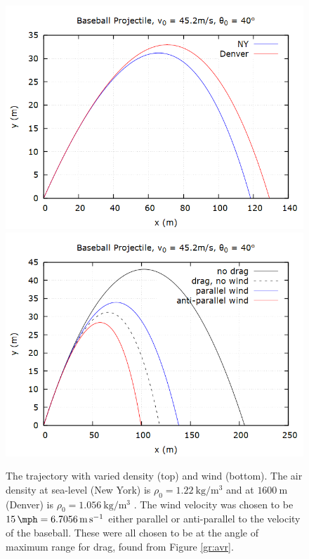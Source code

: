 \documentclass[aps,prl,twocolumn,superscriptaddress]{revtex4-1}
\begin{document}
\begin{figure}[htbp]
  	\begin{center}
 		\includegraphics[scale=0.3]{NYvDen.png}
 		\includegraphics[scale=0.3]{wind.png}
  		\caption{The trajectory with varied density (top) and wind (bottom). The air density at sea-level (New York) is $\rho_0 = \SI{1.22}{\kg\per\m\cubed}$ and at $\SI{1600}{\m}$ (Denver) is $\rho_0 = \SI{1.056}{\kg\per\m\cubed}$ \cite{air}. The wind velocity was chosen to be $\SI{15}{\mph} = \SI{6.7056}{\m\per\s}$ either parallel or anti-parallel to the velocity of the baseball. These were all chosen to be at the angle of maximum range for drag, found from Figure \ref{gr:avr}.}
  		\label{gr:vary}
 	\end{center}
\end{figure}
\end{document}
